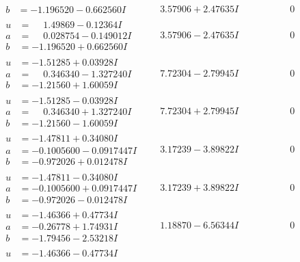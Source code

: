 \documentclass[1p]{elsarticle_modified}
\theoremstyle{definition}
\begin{document}
$$\begin{array}{c|c|c}
\begin{aligned}
b &= -1.196520 - 0.662560 I\end{aligned}
 & \phantom{-}3.57906 + 2.47635 I & \phantom{-0.000000 } 0 \\ \hline\begin{aligned}
u &= \phantom{-}1.49869 - 0.12364 I \\
a &= \phantom{-}0.028754 - 0.149012 I \\
b &= -1.196520 + 0.662560 I\end{aligned}
 & \phantom{-}3.57906 - 2.47635 I & \phantom{-0.000000 } 0 \\ \hline\begin{aligned}
u &= -1.51285 + 0.03928 I \\
a &= \phantom{-}0.346340 - 1.327240 I \\
b &= -1.21560 + 1.60059 I\end{aligned}
 & \phantom{-}7.72304 - 2.79945 I & \phantom{-0.000000 } 0 \\ \hline\begin{aligned}
u &= -1.51285 - 0.03928 I \\
a &= \phantom{-}0.346340 + 1.327240 I \\
b &= -1.21560 - 1.60059 I\end{aligned}
 & \phantom{-}7.72304 + 2.79945 I & \phantom{-0.000000 } 0 \\ \hline\begin{aligned}
u &= -1.47811 + 0.34080 I \\
a &= -0.1005600 - 0.0917447 I \\
b &= -0.972026 + 0.012478 I\end{aligned}
 & \phantom{-}3.17239 - 3.89822 I & \phantom{-0.000000 } 0 \\ \hline\begin{aligned}
u &= -1.47811 - 0.34080 I \\
a &= -0.1005600 + 0.0917447 I \\
b &= -0.972026 - 0.012478 I\end{aligned}
 & \phantom{-}3.17239 + 3.89822 I & \phantom{-0.000000 } 0 \\ \hline\begin{aligned}
u &= -1.46366 + 0.47734 I \\
a &= -0.26778 + 1.74931 I \\
b &= -1.79456 - 2.53218 I\end{aligned}
 & \phantom{-}1.18870 - 6.56344 I & \phantom{-0.000000 } 0 \\ \hline\begin{aligned}
u &= -1.46366 - 0.47734 I \\

\end{aligned}
\end{array}$$
\end{document}
